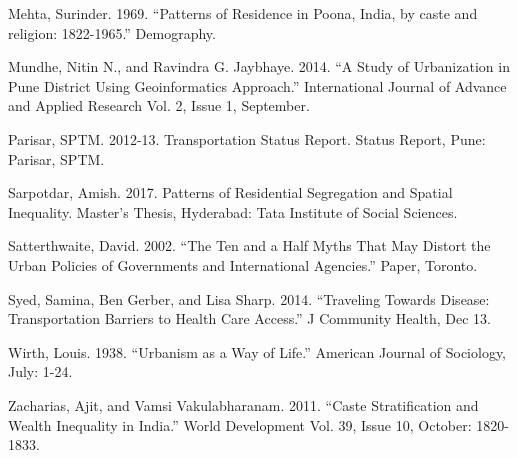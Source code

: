 \documentclass[
]{article}
\begin{document}
Mehta, Surinder. 1969. ``Patterns of Residence in Poona, India, by caste
and religion: 1822-1965.'' Demography.

Mundhe, Nitin N., and Ravindra G. Jaybhaye. 2014. ``A Study of
Urbanization in Pune District Using Geoinformatics Approach.''
International Journal of Advance and Applied Research Vol. 2, Issue 1,
September.

Parisar, SPTM. 2012-13. Transportation Status Report. Status Report,
Pune: Parisar, SPTM.

Sarpotdar, Amish. 2017. Patterns of Residential Segregation and Spatial
Inequality. Master's Thesis, Hyderabad: Tata Institute of Social
Sciences.

Satterthwaite, David. 2002. ``The Ten and a Half Myths That May Distort
the Urban Policies of Governments and International Agencies.'' Paper,
Toronto.

Syed, Samina, Ben Gerber, and Lisa Sharp. 2014. ``Traveling Towards
Disease: Transportation Barriers to Health Care Access.'' J Community
Health, Dec 13.

Wirth, Louis. 1938. ``Urbanism as a Way of Life.'' American Journal of
Sociology, July: 1-24.

Zacharias, Ajit, and Vamsi Vakulabharanam. 2011. ``Caste Stratification
and Wealth Inequality in India.'' World Development Vol. 39, Issue 10,
October: 1820-1833.
\end{document}
